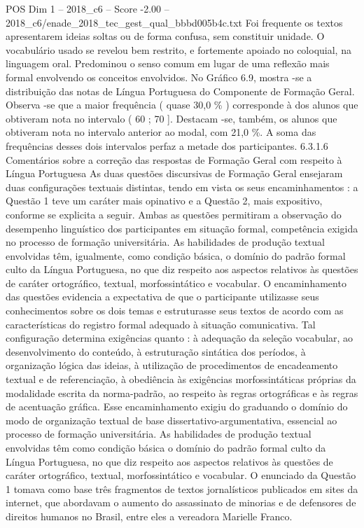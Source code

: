 \begin{textsample}{POS Dim 1 – 2018\_c6 – Score -2.00 – 2018\_c6/enade\_2018\_tec\_gest\_qual\_bbbd005b4c.txt}
Foi frequente os textos apresentarem ideias soltas ou de forma confusa, sem constituir unidade.
O vocabulário usado se revelou bem restrito, e fortemente apoiado no coloquial, na linguagem oral.
Predominou o senso comum em lugar de uma reflexão mais formal envolvendo os conceitos envolvidos.
No Gráfico 6.9, mostra -se a distribuição das notas de Língua Portuguesa do Componente de Formação Geral.
Observa -se que a maior frequência ( quase 30,0 \% ) corresponde à dos alunos que obtiveram nota no intervalo ( 60 ; 70 ].
Destacam -se, também, os alunos que obtiveram nota no intervalo anterior ao modal, com 21,0 \%.
A soma das frequências desses dois intervalos perfaz a metade dos participantes. 6.3.1.6 Comentários sobre a correção das respostas de Formação Geral com respeito à Língua Portuguesa As duas questões discursivas de Formação Geral ensejaram duas configurações textuais distintas, tendo em vista os seus encaminhamentos : a Questão 1 teve um caráter mais opinativo e a Questão 2, mais expositivo, conforme se explicita a seguir.
Ambas as questões permitiram a observação do desempenho linguístico dos participantes em situação formal, competência exigida no processo de formação universitária.
As habilidades de produção textual envolvidas têm, igualmente, como condição básica, o domínio do padrão formal culto da Língua Portuguesa, no que diz respeito aos aspectos relativos às questões de caráter ortográfico, textual, morfossintático e vocabular.
O encaminhamento das questões evidencia a expectativa de que o participante utilizasse seus conhecimentos sobre os dois temas e estruturasse seus textos de acordo com as características do registro formal adequado à situação comunicativa.
Tal configuração determina exigências quanto : à adequação da seleção vocabular, ao desenvolvimento do conteúdo, à estruturação sintática dos períodos, à organização lógica das ideias, à utilização de procedimentos de encadeamento textual e de referenciação, à obediência às exigências morfossintáticas próprias da modalidade escrita da norma-padrão, ao respeito às regras ortográficas e às regras de acentuação gráfica.
Esse encaminhamento exigiu do graduando o domínio do modo de organização textual de base dissertativo-argumentativa, essencial ao processo de formação universitária.
As habilidades de produção textual envolvidas têm como condição básica o domínio do padrão formal culto da Língua Portuguesa, no que diz respeito aos aspectos relativos às questões de caráter ortográfico, textual, morfossintático e vocabular.
O enunciado da Questão 1 tomava como base três fragmentos de textos jornalísticos publicados em sites da internet, que abordavam o aumento do assassinato de minorias e de defensores de direitos humanos no Brasil, entre eles a vereadora Marielle Franco.

\end{textsample}
